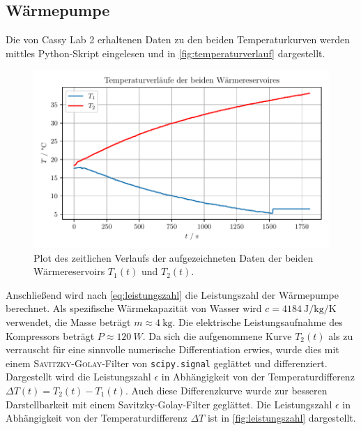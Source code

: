 \documentclass[english, ngerman]{scrartcl}
\begin{document}
\subsection{Wärmepumpe}
\label{subsec:auswertung_waermepumpe}

Die von Cassy Lab 2 erhaltenen Daten zu den beiden Temperaturkurven werden mittles Python-Skript eingelesen und in \autoref{fig:temperaturverlauf} dargestellt.
%
\begin{figure}[H]
    \centering
    \begin{samepage}
        \includegraphics[width=0.8\linewidth]{fig/plots/T_Verlauf.pdf}
        \caption[Temperaturverlauf Wärmepumpe]{Plot des zeitlichen Verlaufs der aufgezeichneten Daten der beiden Wärmereservoirs $T_1(t)$ und $T_2(t)$.}
        \label{fig:temperaturverlauf}
    \end{samepage}
\end{figure}
%
Anschließend wird nach \autoref{eq:leistungszahl} die Leistungszahl der Wärmepumpe berechnet. Als spezifische Wärmekapazität von Wasser wird $c = \SI{4184}{\joule\per\kilogram\per\kelvin}$ verwendet, die Masse beträgt $m \approx \SI{4}{\kilo\gram}$. Die elektrische Leistungsaufnahme des Kompressors beträgt $P \approx \SI{120}{W}$. Da sich die aufgenommene Kurve $T_2(t)$ als zu verrauscht für eine sinnvolle numerische Differentiation erwies, wurde dies mit einem \textsc{Savitzky-Golay}-Filter von \texttt{scipy.signal} geglättet und differenziert. Dargestellt wird die Leistungszahl $\epsilon$ in Abhängigkeit von der Temperaturdifferenz $\Delta T(t) = T_2(t) - T_1(t)$. Auch diese Differenzkurve wurde zur besseren Darstellbarkeit mit einem Savitzky-Golay-Filter geglättet. Die Leistungszahl $\epsilon$ in Abhängigkeit von der Temperaturdifferenz $\Delta T$ ist in \autoref{fig:leistungszahl} dargestellt.
%
\end{document}
